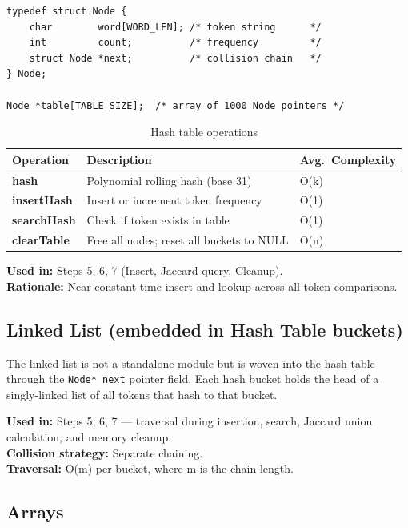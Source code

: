 \documentclass[12pt,a4paper]{article}
\begin{document}
\begin{lstlisting}[caption={Hash table node -- \texttt{hash.h}}]
typedef struct Node {
    char        word[WORD_LEN]; /* token string      */
    int         count;          /* frequency         */
    struct Node *next;          /* collision chain   */
} Node;

Node *table[TABLE_SIZE];  /* array of 1000 Node pointers */
\end{lstlisting}

\begin{table}[H]
\centering\renewcommand{\arraystretch}{1.3}
\begin{tabularx}{0.92\textwidth}{>{\bfseries\ttfamily}l X l}
\toprule
Operation & Description & Avg.\ Complexity \\\midrule
hash        & Polynomial rolling hash (base 31)         & O(k) \\
insertHash  & Insert or increment token frequency       & O(1) \\
searchHash  & Check if token exists in table            & O(1) \\
clearTable  & Free all nodes; reset all buckets to NULL & O(n) \\
\bottomrule
\end{tabularx}
\caption{Hash table operations}
\end{table}

\textbf{Used in:} Steps 5, 6, 7 (Insert, Jaccard query, Cleanup).\\
\textbf{Rationale:} Near-constant-time insert and lookup across all token comparisons.

\subsection{Linked List (embedded in Hash Table buckets)}

The linked list is not a standalone module but is woven into the hash table through the \texttt{Node*\ next} pointer field. Each hash bucket holds the head of a singly-linked list of all tokens that hash to that bucket.

\textbf{Used in:} Steps 5, 6, 7 — traversal during insertion, search, Jaccard union calculation, and memory cleanup.\\
\textbf{Collision strategy:} Separate chaining.\\
\textbf{Traversal:} O(m) per bucket, where m is the chain length.

\subsection{Arrays}
\end{document}
